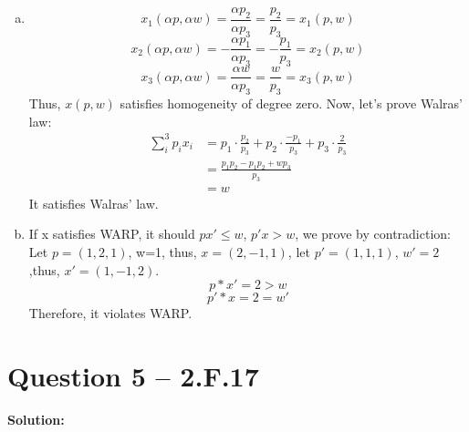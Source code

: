 \documentclass[11pt]{article} %
\begin{document}
\begin{enumerate}[(a)]
    \item $$x_1(\alpha p, \alpha w)=\frac{\alpha p_2}{\alpha p_3}=\frac{p_2}{p_3}=x_1(p,w)$$
        \begin{equation*}
            x_2(\alpha p,\alpha w)=-\frac{\alpha p_1}{\alpha p_3}=-\frac{p_1}{p_3}=x_2(p,w)
        \end{equation*}
        \begin{equation*}
            x_3(\alpha p, \alpha w)=\frac{\alpha w}{\alpha p_3}=\frac{w}{p_3}=x_3(p,w)
        \end{equation*}
        Thus, $x(p,w)$ satisfies homogeneity of degree zero.
        Now, let's  prove Walras' law:
        \begin{align*}
            \sum_i^3 p_ix_i&= p_1\cdot \frac{p_2}{p_3}+p_2\cdot \frac{-p_1}{p_3}+p_3\cdot \frac{2}{p_3}\\
                            &= \frac{p_1p_2-p_1p_2+wp_3}{p_3}\\
                            &=w
        \end{align*}
        It satisfies Walras' law.
    \item If x satisfies WARP, it should $px'\leq w$,  $p'x>w$,  we prove by contradiction:
        Let $p=(1,2,1)$, w=1, thus, $x=(2,-1,1)$, let $p'=(1,1,1)$, $w'=2$,thus, $x'=(1,-1,2)$.
        \begin{equation*}
            p*x'=2>w
        \end{equation*}
        \begin{equation*}
            p'*x=2=w'
        \end{equation*}
        Therefore, it violates WARP.
\end{enumerate}

\section{Question 5 -- 2.F.17}
\textbf{Solution:}
\end{document}
